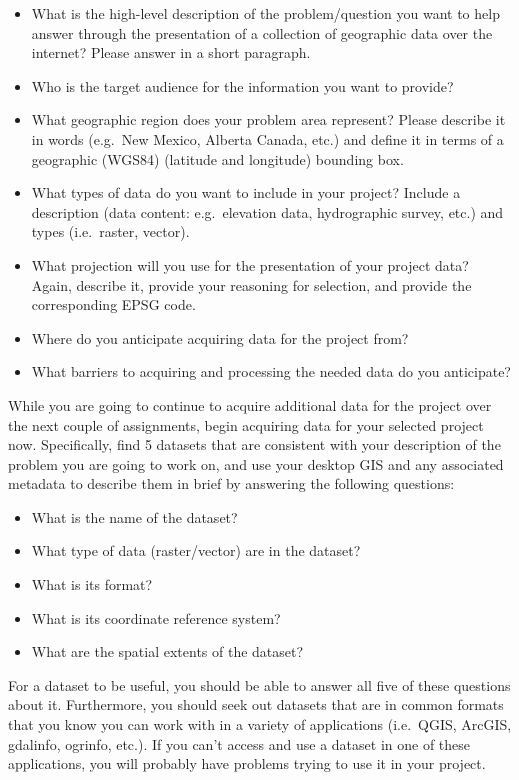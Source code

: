 \documentclass[]{book}
\begin{document}
\begin{itemize}
\item
  What is the high-level description of the problem/question you want to
  help answer through the presentation of a collection of geographic
  data over the internet? Please answer in a short paragraph.
\item
  Who is the target audience for the information you want to provide?
\item
  What geographic region does your problem area represent? Please
  describe it in words (e.g.~New Mexico, Alberta Canada, etc.) and
  define it in terms of a geographic (WGS84) (latitude and longitude)
  bounding box.
\item
  What types of data do you want to include in your project? Include a
  description (data content: e.g.~elevation data, hydrographic survey,
  etc.) and types (i.e.~raster, vector).
\item
  What projection will you use for the presentation of your project
  data? Again, describe it, provide your reasoning for selection, and
  provide the corresponding EPSG code.
\item
  Where do you anticipate acquiring data for the project from?
\item
  What barriers to acquiring and processing the needed data do you
  anticipate?
\end{itemize}

While you are going to continue to acquire additional data for the
project over the next couple of assignments, begin acquiring data for
your selected project now. Specifically, find 5 datasets that are
consistent with your description of the problem you are going to work
on, and use your desktop GIS and any associated metadata to describe
them in brief by answering the following questions:

\begin{itemize}
\item
  What is the name of the dataset?
\item
  What type of data (raster/vector) are in the dataset?
\item
  What is its format?
\item
  What is its coordinate reference system?
\item
  What are the spatial extents of the dataset?
\end{itemize}

For a dataset to be useful, you should be able to answer all five of
these questions about it. Furthermore, you should seek out datasets that
are in common formats that you know you can work with in a variety of
applications (i.e.~QGIS, ArcGIS, gdalinfo, ogrinfo, etc.). If you can't
access and use a dataset in one of these applications, you will probably
have problems trying to use it in your project.
\end{document}
